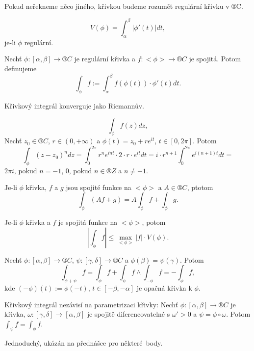\documentclass[12pt]{article}					%
\begin{document}
\begin{poznamka}[Úmluva]
	Pokud neřekneme něco jiného, křivkou budeme rozumět regulární křivku v ®C.
\end{poznamka}

\begin{definice}
	$$ V(\phi) = \int_\alpha^\beta |\phi'(t)| dt, $$
	je-li $\phi$ regulární.
\end{definice}

\begin{definice}
	Nechť $\phi: [\alpha, \beta] \rightarrow ®C$ je regulární křivka a $f: <\phi> \rightarrow ®C$ je spojitá. Potom definujeme
	$$ \int_\phi f := \int_\alpha^\beta f(\phi(t))·\phi'(t) dt. $$
\end{definice}

\begin{poznamka}
	Křivkový integrál konverguje jako Riemannův.

	$$ \int_\phi f(z) dz, $$
	Nechť $z_0 \in ®C$, $r \in (0, +∞)$ a $\phi(t) = z_0 + r e^{it}$, $t \in [0, 2\pi]$. Potom
	$$ \int_\phi (z - z_0)^n dz = \int_0^{2\pi} r^n e^{i n t}·2·r·e^{it} dt = i·r^{n+1} \int_0^{2\pi} e^{i(n + 1) t} dt = $$
	$2\pi i$, pokud $n = -1$, 0, pokud $n \in ®Z$ a $n ≠ -1$.
\end{poznamka}

\begin{tvrzeni}
	Je-li $\phi$ křivka, $f$ a $g$ jsou spojité funkce na $<\phi>$ a $A \in ®C$, ptotom
	$$ \int_\phi (Af + g) = A\int_\phi f + \int_\phi g. $$

	Je-li $\phi$ křivka a $f$ je spojitá funkce na $<\phi>$, potom
	$$ |\int_\phi f| ≤ \max_{<\phi>} |f|·V(\phi). $$

	Nechť $\phi: [\alpha, \beta] \rightarrow ®C$, $\psi: [\gamma, \delta] \rightarrow ®C$ a $\phi(\beta) = \psi(\gamma)$. Potom
	$$ \int_{\phi + \psi} f = \int_\phi f + \int_\psi f \land \int_{-\phi} f = - \int_\phi f, $$
	kde $(-\phi)(t) := \phi(-t)$, $t \in [-\beta, -\alpha]$ je opačná křivka k $\phi$.

	Křivkový integrál nezávisí na parametrizaci křivky: Nechť $\phi: [\alpha, \beta] \rightarrow ®C$ je křivka, $\omega: [\gamma, \delta] \rightarrow [\alpha, \beta]$ je spojitě diferencovatelné s $\omega' > 0$ a $\psi = \phi\circ\omega$. Potom $\int_\psi f = \int_\phi f$.

	\begin{dukazin}
		Jednoduchý, ukázán na přednášce pro některé body.
	\end{dukazin}
\end{tvrzeni}
\end{document}
